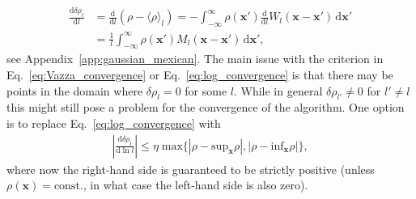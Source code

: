 \documentclass[]{article}
\begin{document}
%
\begin{align}\label{eq:delta_density_mexican}
	\frac{\mathrm{d} \delta \rho_l}{\mathrm{d} l} &= \frac{\mathrm{d} }{\mathrm{d} l} \left( \rho - \langle \rho \rangle_l \right) = -   \int_{-\infty}^{\infty} \rho(\bm x') \frac{\mathrm{d} }{\mathrm{d} l} W_l(\bm x-\bm x')\, \mathrm{d}\bm x' \nonumber \\
	&= \frac{1}{l} \int_{-\infty}^{\infty} \rho(\bm x') M_l(\bm x-\bm x')\, \mathrm{d}\bm x',
\end{align}
%
see Appendix~\ref{app:gaussian_mexican}. The main issue with the criterion in Eq.~\eqref{eq:Vazza_convergence} or Eq.~\eqref{eq:log_convergence} is that there may be points in the domain where $\delta \rho_l = 0$ for some $l$. While in general $\delta \rho_{l'} \neq 0$ for $l' \neq l$ this might still pose a problem for the convergence of the algorithm. One option is to replace Eq.~\eqref{eq:log_convergence} with
%
\begin{align}\label{eq:log_convergence_mod1}
	\left\lvert\frac{\mathrm{d} \delta \rho_l}{\mathrm{d} \ln l} \right\rvert \leq \eta \; \text{max} \lbrace \left\lvert \rho - \text{sup}_{\bm x} \rho \right\rvert, \left\lvert \rho - \text{inf}_{\bm x} \rho \right\rvert  \rbrace,
\end{align}
%
where now the right-hand side is guaranteed to be strictly positive (unless $\rho (\bm x) = \text{const.}$, in what case the left-hand side is also zero).
\end{document}
